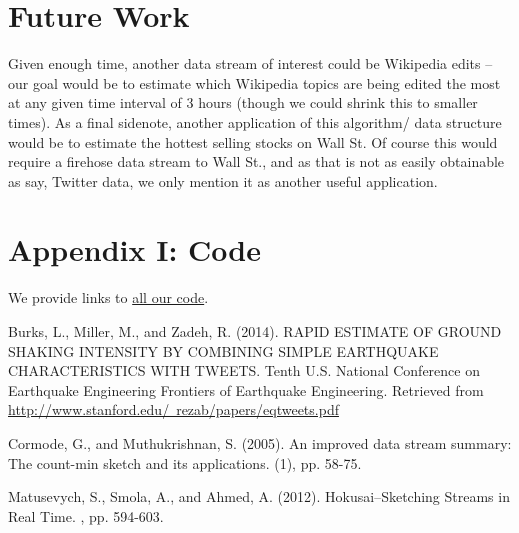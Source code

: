 \documentclass[twoside]{article}
\begin{document}
\begin{multicols}{2}
\section{Future Work} \label{sec:Future Work}

Given enough time, another data stream of interest could be Wikipedia edits -- our goal would be to estimate which Wikipedia topics are being edited the most at any given time interval of 3 hours (though we could shrink this to smaller times). As a final sidenote, another application of this algorithm/ data structure would be to estimate the hottest selling stocks on Wall St. Of course this would require a firehose data stream to Wall St., and as that is not as easily obtainable as say, Twitter data, we only mention it as another useful application.

\section{Appendix I: Code} \label{sec:Appendix_code}

We provide links to \href{https://github.com/kiranvodrahalli/cos521/}{all our code}.

\end{multicols}


\begin{thebibliography}{99} %


Burks, L., Miller, M., and Zadeh, R. (2014). 
\newblock RAPID ESTIMATE OF GROUND SHAKING INTENSITY BY COMBINING SIMPLE EARTHQUAKE CHARACTERISTICS WITH TWEETS. 
\newblock Tenth U.S. National Conference on Earthquake Engineering Frontiers of Earthquake Engineering. Retrieved from \href{http://www.stanford.edu/~rezab/papers/eqtweets.pdf}{http://www.stanford.edu/~rezab/papers/eqtweets.pdf}

Cormode, G., and Muthukrishnan, S. (2005). 
\newblock An improved data stream summary: The count-min sketch and its applications. 
(1), pp. 58-75.

Matusevych, S., Smola, A., and Ahmed, A. (2012).
\newblock Hokusai--Sketching Streams in Real Time.
, pp. 594-603.


 
\end{thebibliography}

\end{document}
